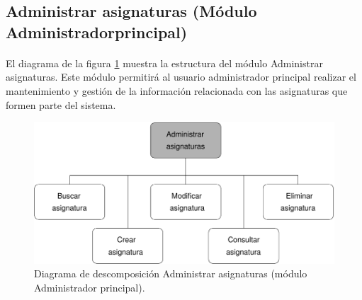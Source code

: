\subsection{Administrar asignaturas (Módulo Administrador\newline principal)}

  \paragraph{}El diagrama de la figura
  \ref{diagramaDescomposicionAdministrarAsignaturas} muestra la estructura del
  módulo Administrar asignaturas. Este módulo permitirá al usuario
  administrador principal realizar el mantenimiento y gestión de la información
  relacionada con las asignaturas que formen parte del sistema.


  \begin{figure}[!ht]
    \begin{center}
      \includegraphics[]{11.Disenyo_Arquitectonico/11.2.Diagramas_Descomposicion/11.2.2.Modulo_administrador_principal/AdministrarBBDD/AdministrarAsignaturas/Diagramas/administrar_asignaturas.pdf}
      \caption{Diagrama de descomposición Administrar asignaturas (módulo Administrador principal).}
      \label{diagramaDescomposicionAdministrarAsignaturas}
    \end{center}
  \end{figure}
